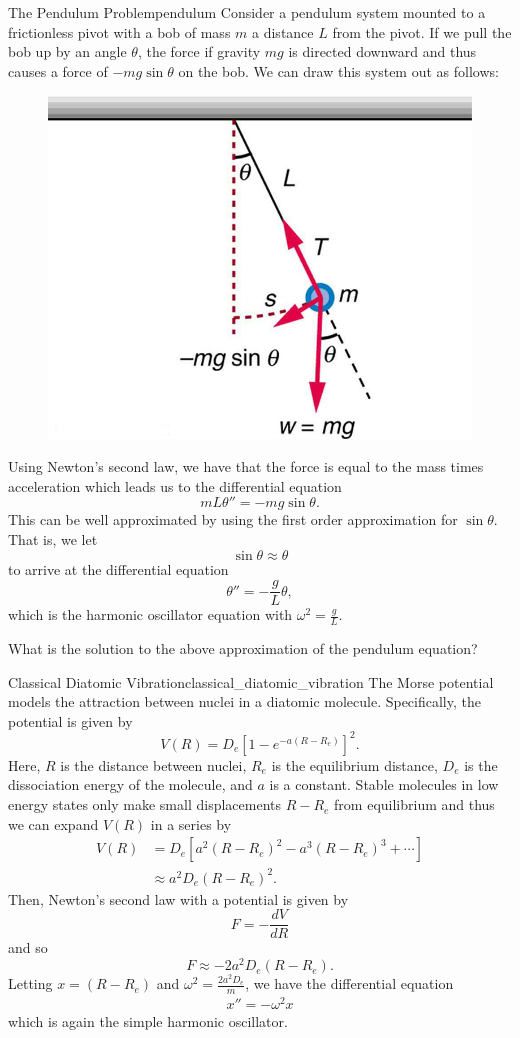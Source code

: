 \begin{ex}{The Pendulum Problem}{pendulum}
Consider a pendulum system mounted to a frictionless pivot with a bob of mass $m$ a distance $L$ from the pivot. If we pull the bob up by an angle $\theta$, the force if gravity $mg$ is directed downward and thus causes a force of $-mg\sin\theta$ on the bob.  We can draw this system out as follows:
\begin{figure}[H]
    \centering
    \includegraphics[width=.5\textwidth]{Figures_Part_3/pendulum.jpg}
\end{figure}
Using Newton's second law, we have that the force is equal to the mass times acceleration which leads us to the differential equation
\[
mL\theta'' = -mg\sin \theta. 
\]
This can be well approximated by using the first order approximation for $\sin \theta$. That is, we let
\[
\sin \theta \approx \theta
\]
to arrive at the differential equation
\[
\theta '' = -\frac{g}{L} \theta,
\]
which is the harmonic oscillator equation with $\omega^2 = \frac{g}{L}$. 
\end{ex}

\begin{exercise}
What is the solution to the above approximation of the pendulum equation?
\end{exercise}

\begin{ex}{Classical Diatomic Vibration}{classical_diatomic_vibration}
The Morse potential models the attraction between nuclei in a diatomic molecule.  Specifically, the potential is given by
\[
V(R)=D_e \left[ 1- e^{-a(R-R_e)}\right]^2.
\]
Here, $R$ is the distance between nuclei, $R_e$ is the equilibrium distance, $D_e$ is the dissociation energy of the molecule, and $a$ is a constant.  Stable molecules in low energy states only make small displacements $R-R_e$ from equilibrium and thus we can expand $V(R)$ in a series by
\begin{align*}
V(R) &= D_e\left[ a^2(R-R_e)^2-a^3(R-R_e)^3+\cdots \right]\\
&\approx a^2 D_e(R-R_e)^2.
\end{align*}
Then, Newton's second law with a potential is given by
\[
F= - \frac{dV}{dR}
\]
and so 
\[
F\approx -2a^2 D_e(R-R_e).
\]
Letting $x=(R-R_e)$ and $\omega^2 = \frac{2a^2D_e}{m}$, we have the differential equation
\begin{align*}
    x'' = -\omega^2 x
\end{align*}
which is again the simple harmonic oscillator.
\end{ex}

